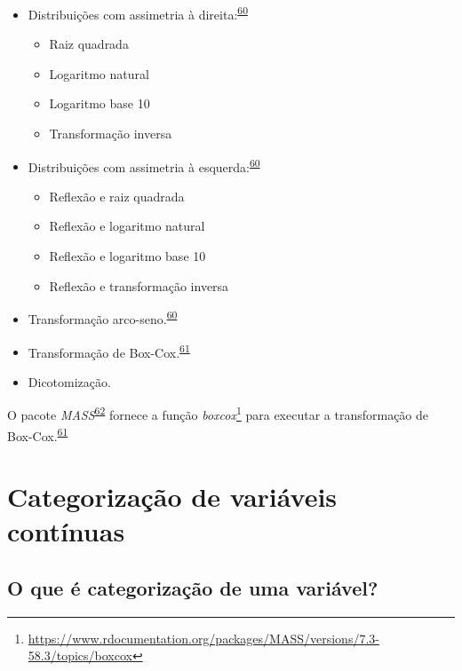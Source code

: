 \documentclass[
  a4paper,
]{book}
\renewcommand{\href}[2]{#2\footnote{\url{#1}}}
\newenvironment{infobox}[1]
  {
  \begin{itemize}
  \renewcommand{\labelitemi}{
    \raisebox{-.7\height}[0pt][0pt]{
      {\setkeys{Gin}{width=3em,keepaspectratio}
        \texttt{[image: \#1]}}
    }
  }
  \setlength{\fboxsep}{1em}
  \begin{blackbox}
  \item
  }
  {
  \end{blackbox}
  \end{itemize}
  }
\begin{document}
\begin{itemize}
\item
  Distribuições com assimetria à direita:\textsuperscript{\protect\hyperlink{ref-osborne2010}{60}}

  \begin{itemize}
  \item
    Raiz quadrada
  \item
    Logaritmo natural
  \item
    Logaritmo base 10
  \item
    Transformação inversa
  \end{itemize}
\item
  Distribuições com assimetria à esquerda:\textsuperscript{\protect\hyperlink{ref-osborne2010}{60}}

  \begin{itemize}
  \item
    Reflexão e raiz quadrada
  \item
    Reflexão e logaritmo natural
  \item
    Reflexão e logaritmo base 10
  \item
    Reflexão e transformação inversa
  \end{itemize}
\item
  Transformação arco-seno.\textsuperscript{\protect\hyperlink{ref-osborne2010}{60}}
\item
  Transformação de Box-Cox.\textsuperscript{\protect\hyperlink{ref-box1964}{61}}
\item
  Dicotomização.
\end{itemize}

\begin{infobox}{images/Rlogo}
O pacote \emph{MASS}\textsuperscript{\protect\hyperlink{ref-MASS}{62}} fornece a função \href{https://www.rdocumentation.org/packages/MASS/versions/7.3-58.3/topics/boxcox}{\emph{boxcox}} para executar a transformação de Box-Cox.\textsuperscript{\protect\hyperlink{ref-box1964}{61}}

\end{infobox}

\hypertarget{categorizacao}{%
\section{Categorização de variáveis contínuas}\label{categorizacao}}

\hypertarget{o-que-uxe9-categorizauxe7uxe3o-de-uma-variuxe1vel}{%
\subsection{O que é categorização de uma variável?}\label{o-que-uxe9-categorizauxe7uxe3o-de-uma-variuxe1vel}}
\end{document}
